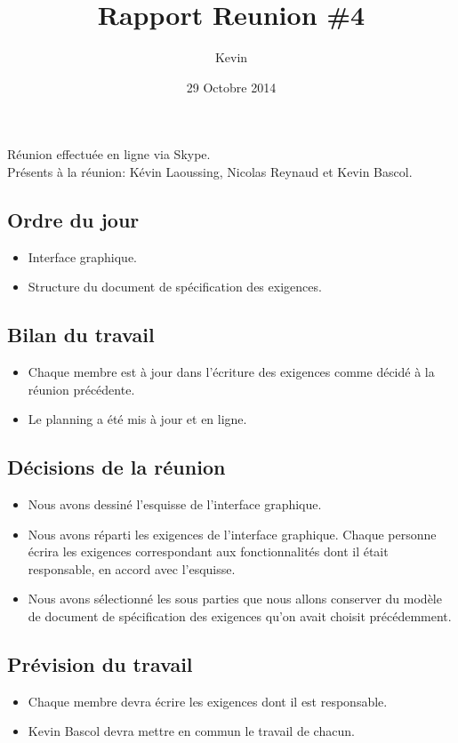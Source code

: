\documentclass{article}
\title{Rapport Reunion \#4}
\author{Kevin \bsc{Bascol}}
\date{29 Octobre 2014}
\begin{document}
\maketitle
\newpage

Réunion effectuée en ligne via Skype.\\
Présents à la réunion: Kévin Laoussing, Nicolas Reynaud et Kevin Bascol.

\subsection*{Ordre du jour}
	\begin{itemize}
		\item Interface graphique.
		\item Structure du document de spécification des exigences.
	\end{itemize}

\subsection*{Bilan du travail}
	\begin{itemize}
		\item Chaque membre est à jour dans l'écriture des exigences comme décidé à la réunion précédente.
		\item Le planning a été mis à jour et en ligne.
	\end{itemize}
	
\subsection*{Décisions de la réunion}
	\begin{itemize}
		\item Nous avons dessiné l'esquisse de l'interface graphique.
		\item Nous avons réparti les exigences de l'interface graphique. Chaque personne écrira les exigences correspondant aux fonctionnalités dont il était responsable, en accord avec l'esquisse.
		\item Nous avons sélectionné les sous parties que nous allons conserver du modèle de document de spécification des exigences qu'on avait choisit précédemment.
	\end{itemize}
	
\subsection*{Prévision du travail}
	\begin{itemize}
		\item Chaque membre devra écrire les exigences dont il est responsable.
		\item Kevin Bascol devra mettre en commun le travail de chacun.
	\end{itemize}
	
\end{document}
